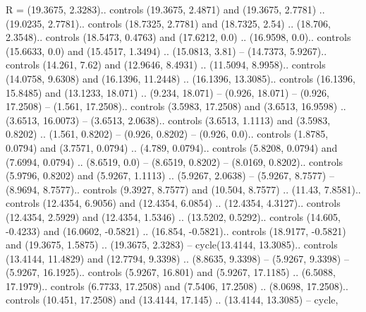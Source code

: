 R = {(19.3675, 2.3283).. controls (19.3675, 2.4871) and (19.3675, 2.7781) .. (19.0235, 2.7781).. controls (18.7325, 2.7781) and (18.7325, 2.54) .. (18.706, 2.3548).. controls (18.5473, 0.4763) and (17.6212, 0.0) .. (16.9598, 0.0).. controls (15.6633, 0.0) and (15.4517, 1.3494) .. (15.0813, 3.81) -- (14.7373, 5.9267).. controls (14.261, 7.62) and (12.9646, 8.4931) .. (11.5094, 8.9958).. controls (14.0758, 9.6308) and (16.1396, 11.2448) .. (16.1396, 13.3085).. controls (16.1396, 15.8485) and (13.1233, 18.071) .. (9.234, 18.071) -- (0.926, 18.071) -- (0.926, 17.2508) -- (1.561, 17.2508).. controls (3.5983, 17.2508) and (3.6513, 16.9598) .. (3.6513, 16.0073) -- (3.6513, 2.0638).. controls (3.6513, 1.1113) and (3.5983, 0.8202) .. (1.561, 0.8202) -- (0.926, 0.8202) -- (0.926, 0.0).. controls (1.8785, 0.0794) and (3.7571, 0.0794) .. (4.789, 0.0794).. controls (5.8208, 0.0794) and (7.6994, 0.0794) .. (8.6519, 0.0) -- (8.6519, 0.8202) -- (8.0169, 0.8202).. controls (5.9796, 0.8202) and (5.9267, 1.1113) .. (5.9267, 2.0638) -- (5.9267, 8.7577) -- (8.9694, 8.7577).. controls (9.3927, 8.7577) and (10.504, 8.7577) .. (11.43, 7.8581).. controls (12.4354, 6.9056) and (12.4354, 6.0854) .. (12.4354, 4.3127).. controls (12.4354, 2.5929) and (12.4354, 1.5346) .. (13.5202, 0.5292).. controls (14.605, -0.4233) and (16.0602, -0.5821) .. (16.854, -0.5821).. controls (18.9177, -0.5821) and (19.3675, 1.5875) .. (19.3675, 2.3283) -- cycle(13.4144, 13.3085).. controls (13.4144, 11.4829) and (12.7794, 9.3398) .. (8.8635, 9.3398) -- (5.9267, 9.3398) -- (5.9267, 16.1925).. controls (5.9267, 16.801) and (5.9267, 17.1185) .. (6.5088, 17.1979).. controls (6.7733, 17.2508) and (7.5406, 17.2508) .. (8.0698, 17.2508).. controls (10.451, 17.2508) and (13.4144, 17.145) .. (13.4144, 13.3085) -- cycle},

